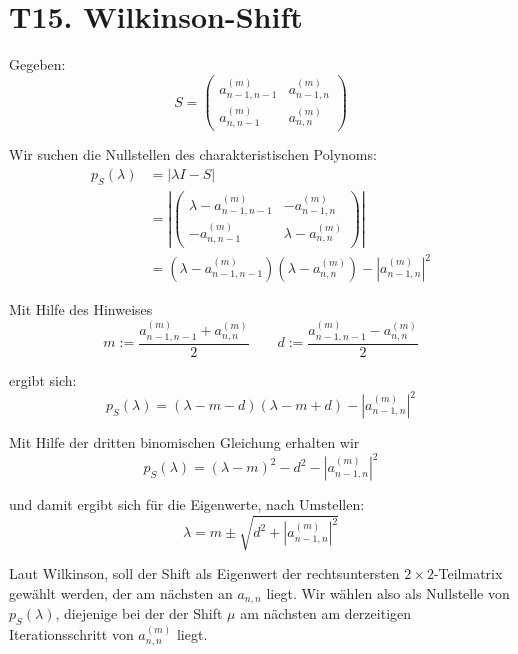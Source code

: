 \documentclass[11pt]{article}
\theoremstyle{plain}
\theoremstyle{definition}
\renewcommand{\a}{\"{a}}
\renewcommand{\u}{\"{u}}
\begin{document}
\section*{T15. Wilkinson-Shift}
Gegeben:
\begin{equation}
S= 
\begin{pmatrix}
a_{n-1,n-1}^{(m)} & a_{n-1,n}^{(m)} \\
a_{n,n-1}^{(m)} & a_{n,n}^{(m)} 
\end{pmatrix}
\end{equation}

Wir suchen die Nullstellen des charakteristischen Polynoms:
\begin{align}
p_S(\lambda) &= |\lambda I-S| \\
&= \left| 
\begin{pmatrix}
\lambda - a_{n-1,n-1}^{(m)} & -a_{n-1,n}^{(m)} \\
-a_{n,n-1}^{(m)} & \lambda - a_{n,n}^{(m)} 
\end{pmatrix}
\right| \\
&= (\lambda - a_{n-1,n-1}^{(m)})(\lambda - a_{n,n}^{(m)}) - |a_{n-1,n}^{(m)}|^2
\end{align}

Mit Hilfe des Hinweises
\begin{equation}
m:=\frac{a_{n-1,n-1}^{(m)}+a_{n,n}^{(m)}}{2} \qquad d:=\frac{a_{n-1,n-1}^{(m)}-a_{n,n}^{(m)}}{2}
\end{equation}

ergibt sich:
\begin{equation}
p_S(\lambda) = (\lambda -m -d)(\lambda - m + d) - |a_{n-1,n}^{(m)}|^2
\end{equation}

Mit Hilfe der dritten binomischen Gleichung erhalten wir
\begin{equation}
p_S(\lambda) = (\lambda - m)^2 - d^2 - |a_{n-1,n}^{(m)}|^2
\end{equation}

und damit ergibt sich f\u r die Eigenwerte, nach Umstellen:
\begin{equation}
\lambda = m \pm \sqrt{d^2 + |a_{n-1,n}^{(m)}|^2}
\end{equation}

Laut Wilkinson, soll der Shift als Eigenwert der rechtsuntersten $2\times 2$-Teilmatrix gew\a hlt werden, der am n\a chsten an $a_{n,n}$ liegt. Wir w\a hlen also als Nullstelle von $p_S(\lambda)$, diejenige bei der der Shift $\mu$ am n\a chsten am derzeitigen Iterationsschritt von $a_{n,n}^{(m)}$ liegt.
\end{document}
